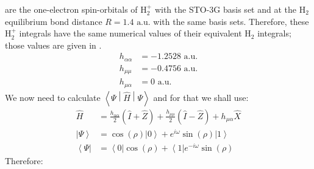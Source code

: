 \documentclass{aux/ttuthes2007}
\newcommand{\bra}[1]{\ensuremath{\left\langle#1\right\vert}}
\newcommand{\ket}[1]{\ensuremath{\left|#1\right\rangle}}
\newcommand{\sandwich}[3]{\left< #1 \middle\vert #2 \middle\vert #3 \right>}
\newcommand{\s}[1]{\sin\left( #1 \right)}
\newcommand{\co}[1]{\cos\left( #1 \right)}
\newcommand{\paren}[1]{\left( #1 \right)}
\begin{document}
are the one-electron spin-orbitals of $\text{H}_2^+$ with the STO-3G basis set and at the $\text{H}_2$ equilibrium bond distance $R = 1.4 \text{ a.u.}$ with the same basis sets.
Therefore, these $\text{H}_2^+$ integrals have the same numerical values of their equivalent $\text{H}_2$ integrals; those values are given in .
\begin{equation*}
	\begin{split}
		h_{\alpha\alpha} &= -1.2528 \text{ a.u.} \\
		h_{\mu\mu} &= -0.4756 \text{ a.u.}\\
		h_{\mu\alpha} &= 0 \text{ a.u.}
	\end{split}
\end{equation*}
%
We now need to calculate $\sandwich{\Psi}{\hat H}{\Psi}$ and for that we shall use:
%
\begin{equation*}
	\begin{split}
		\hat H 
		&= \frac{h_{\alpha\alpha}}{2} \paren{\hat I + \hat Z}
		+ \frac{h_{\mu\mu}}{2} \paren{\hat I - \hat Z} 
		+ h_{\mu\alpha} \hat X\\
		\ket \Psi 
		&= \co \rho \ket 0 + e^{i \omega} \s \rho \ket 1 \\
		\bra \Psi 
		&= \bra 0 \co \rho  + \bra 1 e^{-i \omega} \s \rho 
	\end{split}
\end{equation*}
%
Therefore:
%
\end{document}
